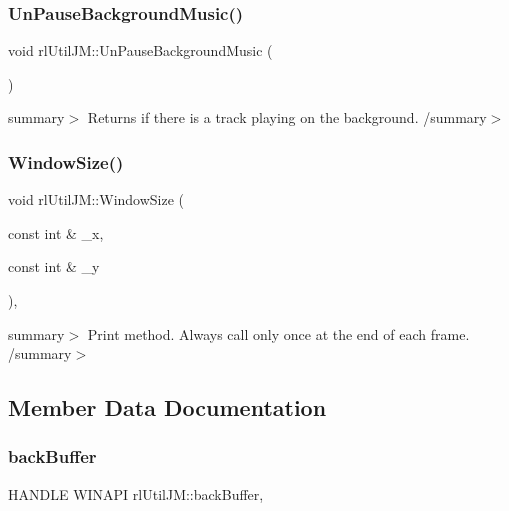 \subsubsection{\texorpdfstring{Un\+Pause\+Background\+Music()}{UnPauseBackgroundMusic()}}
{\footnotesize\ttfamily void rl\+Util\+J\+M\+::\+Un\+Pause\+Background\+Music (\begin{DoxyParamCaption}{ }\end{DoxyParamCaption})\hspace{0.3cm}{\ttfamily [static]}}

summary$>$ Returns if there is a track playing on the background. /summary$>$ \mbox{\label{classrl_util_j_m_a6816ea9d8b393b20bbac3b2712d20654}} 
\subsubsection{\texorpdfstring{Window\+Size()}{WindowSize()}}
{\footnotesize\ttfamily void rl\+Util\+J\+M\+::\+Window\+Size (\begin{DoxyParamCaption}\item[{const int \&}]{\+\_\+x,  }\item[{const int \&}]{\+\_\+y }\end{DoxyParamCaption})\hspace{0.3cm}{\ttfamily [static]}, {\ttfamily [protected]}}

summary$>$ Print method. Always call only once at the end of each frame. /summary$>$ 

\subsection{Member Data Documentation}
\mbox{\label{classrl_util_j_m_a1460d52658dd84c331ea611137fc50f2}} 
\subsubsection{\texorpdfstring{back\+Buffer}{backBuffer}}
{\footnotesize\ttfamily H\+A\+N\+D\+LE W\+I\+N\+A\+PI rl\+Util\+J\+M\+::back\+Buffer\hspace{0.3cm}{\ttfamily [static]}, {\ttfamily [private]}}


